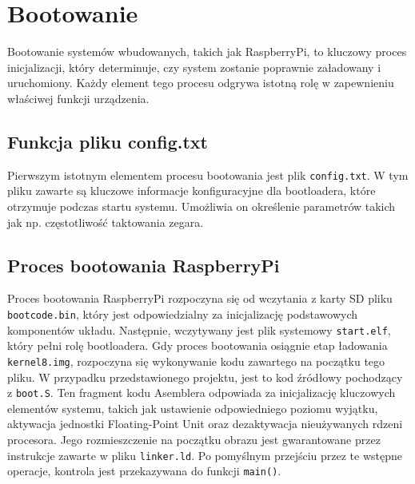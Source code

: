 \documentclass[shortabstract]{iithesis}
\begin{document}
\section{Bootowanie}
Bootowanie systemów wbudowanych, takich jak RaspberryPi, to kluczowy proces inicjalizacji, który determinuje, czy system zostanie poprawnie załadowany i uruchomiony. Każdy element tego procesu odgrywa istotną rolę w zapewnieniu właściwej funkcji urządzenia.
\subsection{Funkcja pliku config.txt}
Pierwszym istotnym elementem procesu bootowania jest plik \texttt{config.txt}. W tym pliku zawarte są kluczowe informacje konfiguracyjne dla bootloadera, które otrzymuje podczas startu systemu. Umożliwia on określenie parametrów takich jak np. częstotliwość taktowania zegara. 
\subsection{Proces bootowania RaspberryPi}
Proces bootowania RaspberryPi rozpoczyna się od wczytania z karty SD pliku \texttt{bootcode.bin}, który jest odpowiedzialny za inicjalizację podstawowych komponentów układu. Następnie, wczytywany jest plik systemowy \texttt{start.elf}, który pełni rolę bootloadera. Gdy proces bootowania osiągnie etap ładowania \texttt{kernel8.img}, rozpoczyna się wykonywanie kodu zawartego na początku tego pliku. W przypadku przedstawionego projektu, jest to kod źródłowy pochodzący z \texttt{boot.S}. Ten fragment kodu Asemblera odpowiada za inicjalizację kluczowych elementów systemu, takich jak ustawienie odpowiedniego poziomu wyjątku, aktywacja jednostki Floating-Point Unit oraz dezaktywacja nieużywanych rdzeni procesora. Jego rozmieszczenie na początku obrazu jest gwarantowane przez instrukcje zawarte w pliku \texttt{linker.ld}. Po pomyślnym przejściu przez te wstępne operacje, kontrola jest przekazywana do funkcji \texttt{main()}.
\end{document}
